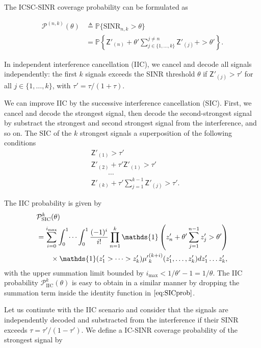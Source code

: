 \documentclass[lettersize,journal]{IEEEtran}
\begin{document}
The ICSC-SINR coverage probability can be formulated as

\begin{align}
  \mathcal{P}^{(n,k)}(\theta) &\triangleq \mathbb{P}\{\text{SINR}_{n,k} > \theta \} \nonumber \\
  &= \mathbb{P} \left\{ \mathsf{Z}'_{(n)}+\theta'\sum^{j \neq n}_{j\in\{1,\dots,k\}}\mathsf{Z}'_{(j)} +>\theta'\right\}.
\end{align}


In independent interference cancellation (IIC), we cancel and decode all signals independently: the first $k$ signals exceeds the SINR threshold $\theta$ if $\mathsf{Z}'_{(j)} > \tau'$ for all $j \in \{1,\dots,k\}$, with $\tau'=\tau/(1+\tau)$. 


We can improve IIC by the successive interference cancellation (SIC). First, we cancel and decode the strongest signal, then decode the second-strongest signal by substract the strongest and second strongest signal from the interference, and so on. The SIC of the $k$ strongest signals a superposition of the following conditions
\begin{align}
  \label{eq:SICcond}
  &\mathsf{Z}'_{(1)} > \tau'\nonumber\\
  &\mathsf{Z}'_{(2)} + \tau' \mathsf{Z}'_{(1)}> \tau' \nonumber\\
  &\hspace{1cm}\dots\nonumber \\
  &\mathsf{Z}'_{(k)} + \tau' \sum_{j=1}^{k-1}\mathsf{Z}'_{(j)}> \tau'.
\end{align}

The IIC probability is given by
\begin{align}
  \label{eq:SICprob}
    &\mathcal{P}_{\text{SIC}}^{k}(\theta) \nonumber\\
    &= \sum^{i_{\text{max}}}_{i=0} \int_{0}^1 \dots \int_{0}^1\frac{(-1)^i}{i!}\prod_{n=1}^k\mathds{1}\left( z'_n+ \theta'\sum_{j=1}^{n-1} z'_j>\theta' \right) \nonumber \\
    &\hspace{0.7cm}\times \mathds{1}(z'_1>\dots>z'_k){\mu'}_k^{(k+i)}(z'_1,\dots,z'_k) d z'_1 \dots z'_k,
\end{align}
with the upper summation limit bounded by $i_{\text{max}} < 1/\theta'-1=1/\theta.$ The IIC probability $\mathcal{P}_{\text{IIC}}^{k}(\theta)$ is easy to obtain in a similar manner by dropping the summation term inside the identity function in $\eqref{eq:SICprob}$.


Let us continute with the IIC scenario and consider that the signals are independently decoded and substracted from the interference if their SINR exceeds $\tau=\tau'/(1-\tau')$. We define a IC-SINR coverage probability of the strongest signal by
\end{document}

